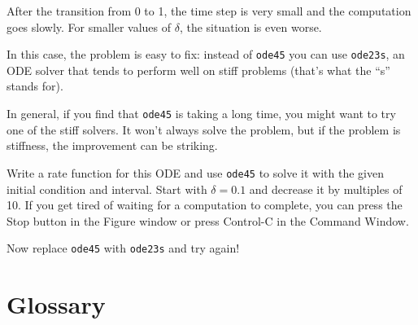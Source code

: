 \documentclass[
]{book}
\begin{document}
After the transition from 0 to 1, the time step is very small and the
computation goes slowly.  For smaller values of $\delta$, the
situation is even worse.

In this case, the problem is easy to fix: instead of {\tt ode45} you can
use {\tt ode23s}, an ODE solver that tends to perform well on stiff
problems (that's what the ``s'' stands for).

In general, if you find that {\tt ode45} is taking a long time, you
might want to try one of the stiff solvers.  It won't always solve
the problem, but if the problem is stiffness, the improvement can
be striking.

\begin{ex}
Write a rate function for this ODE and use
{\tt ode45} to solve it with the given initial condition and interval.
Start with $\delta = 0.1$ and decrease it by multiples of 10.  If
you get tired of waiting for a computation to complete, you can
press the Stop button in the Figure window or press Control-C in
the Command Window.

Now replace {\tt ode45} with {\tt ode23s} and try again!
\end{ex}



\section{Glossary}
\end{document}
